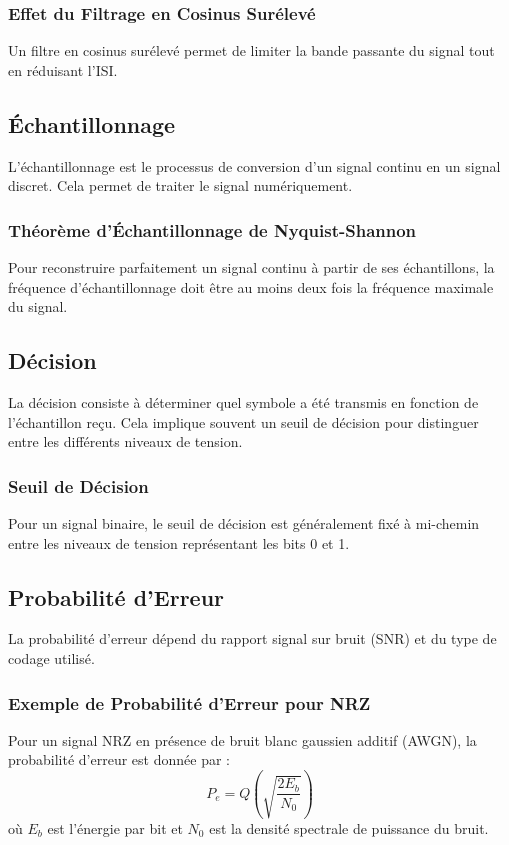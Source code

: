 \documentclass[10pt,a4paper]{article}
\begin{document}
\subsubsection*{Effet du Filtrage en Cosinus Surélevé}
Un filtre en cosinus surélevé permet de limiter la bande passante du signal tout en réduisant l'ISI.

\subsection*{Échantillonnage}
L'échantillonnage est le processus de conversion d'un signal continu en un signal discret. Cela permet de traiter le signal numériquement.

\subsubsection*{Théorème d'Échantillonnage de Nyquist-Shannon}
Pour reconstruire parfaitement un signal continu à partir de ses échantillons, la fréquence d'échantillonnage doit être au moins deux fois la fréquence maximale du signal.

\subsection*{Décision}
La décision consiste à déterminer quel symbole a été transmis en fonction de l'échantillon reçu. Cela implique souvent un seuil de décision pour distinguer entre les différents niveaux de tension.

\subsubsection*{Seuil de Décision}
Pour un signal binaire, le seuil de décision est généralement fixé à mi-chemin entre les niveaux de tension représentant les bits 0 et 1.

\subsection*{Probabilité d'Erreur}
La probabilité d'erreur dépend du rapport signal sur bruit (SNR) et du type de codage utilisé.

\subsubsection*{Exemple de Probabilité d'Erreur pour NRZ}
Pour un signal NRZ en présence de bruit blanc gaussien additif (AWGN), la probabilité d'erreur est donnée par :
\[ P_e = Q\left(\sqrt{\frac{2E_b}{N_0}}\right) \]
où \( E_b \) est l'énergie par bit et \( N_0 \) est la densité spectrale de puissance du bruit.
\end{document}
